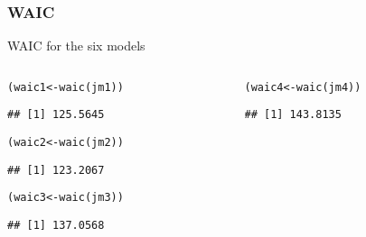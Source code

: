 \documentclass[color=usenames,dvipsnames]{beamer}\usepackage[]{graphicx}\usepackage[]{xcolor}
\makeatletter
\newcommand{\hldef}[1]{\textcolor[rgb]{0,0,0}{#1}}%
\newcommand{\hlkwb}[1]{\textcolor[rgb]{0,0.341,0.682}{#1}}%
\newcommand{\hlkwd}[1]{\textcolor[rgb]{0.004,0.004,0.506}{#1}}%
\newenvironment{kframe}{%
 \def\at@end@of@kframe{}%
 \ifinner\ifhmode%
  \def\at@end@of@kframe{\end{minipage}}%
  \begin{minipage}{\columnwidth}%
 \fi\fi%
 \def\FrameCommand##1{\hskip\@totalleftmargin \hskip-\fboxsep
 \colorbox{shadecolor}{##1}\hskip-\fboxsep
     \hskip-\linewidth \hskip-\@totalleftmargin \hskip\columnwidth}%
 \MakeFramed {\advance\hsize-\width
   \@totalleftmargin\z@ \linewidth\hsize
   \@setminipage}}%
 {\par\unskip\endMakeFramed%
 \at@end@of@kframe}
\newenvironment{knitrout}{}{} %
\makeatother
\begin{document}
\begin{frame}[fragile]
  \frametitle{WAIC}
  WAIC for the six models
  \begin{columns}
    \begin{column}{0.5\textwidth}
\begin{knitrout}\scriptsize
{}\color{fgcolor}\begin{kframe}
\begin{alltt}
\hldef{(waic1} \hlkwb{<-} \hlkwd{waic}\hldef{(jm1))}
\end{alltt}
\begin{verbatim}
## [1] 125.5645
\end{verbatim}
\end{kframe}
\end{knitrout}
\begin{knitrout}\scriptsize
{}\color{fgcolor}\begin{kframe}
\begin{alltt}
\hldef{(waic2} \hlkwb{<-} \hlkwd{waic}\hldef{(jm2))}
\end{alltt}
\begin{verbatim}
## [1] 123.2067
\end{verbatim}
\end{kframe}
\end{knitrout}
\begin{knitrout}\scriptsize
{}\color{fgcolor}\begin{kframe}
\begin{alltt}
\hldef{(waic3} \hlkwb{<-} \hlkwd{waic}\hldef{(jm3))}
\end{alltt}
\begin{verbatim}
## [1] 137.0568
\end{verbatim}
\end{kframe}
\end{knitrout}
    \end{column}
    \begin{column}{0.5\textwidth}
\begin{knitrout}\scriptsize
{}\color{fgcolor}\begin{kframe}
\begin{alltt}
\hldef{(waic4} \hlkwb{<-} \hlkwd{waic}\hldef{(jm4))}
\end{alltt}
\begin{verbatim}
## [1] 143.8135
\end{verbatim}
\end{kframe}

\end{knitrout}
\end{column}
\end{columns}
\end{frame}
\end{document}
